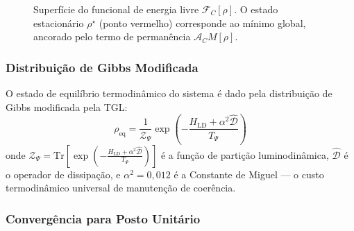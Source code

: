 \documentclass[12pt,a4paper]{article}
\newcommand{\FC}{\mathcal{F}_C}
\newcommand{\AC}{\mathcal{A}_C}
\newcommand{\Hld}{H_{\text{LD}}}
\newcommand{\alphaii}{\alpha^2}
\newcommand{\rhostar}{\rho^\star}
\begin{document}
\begin{figure}[H]
\centering
{}
\caption{Superfície do funcional de energia livre $\FC[\rho]$.
O estado estacionário $\rhostar$ (ponto vermelho) corresponde ao
mínimo global, ancorado pelo termo de permanência $\AC M[\rho]$.}
\label{fig:funcional}
\end{figure}

\subsubsection{Distribuição de Gibbs Modificada}

O estado de equilíbrio termodinâmico do sistema é dado pela
distribuição de Gibbs modificada pela TGL:
\begin{equation}
\rho_{\text{eq}} = \frac{1}{\mathcal{Z}_\Psi}
  \exp\left(-\frac{\Hld + \alphaii \hat{\mathcal{D}}}{T_\Psi}\right)
\label{eq:gibbs}
\end{equation}
onde $\mathcal{Z}_\Psi = \text{Tr}\left[\exp\left(-\frac{\Hld +
\alphaii \hat{\mathcal{D}}}{T_\Psi}\right)\right]$ é a função de
partição luminodinâmica, $\hat{\mathcal{D}}$ é o operador de
dissipação, e $\alphaii = 0{,}012$ é a Constante de Miguel ---
o custo termodinâmico universal de manutenção de coerência.

\subsubsection{Convergência para Posto Unitário}
\end{document}
